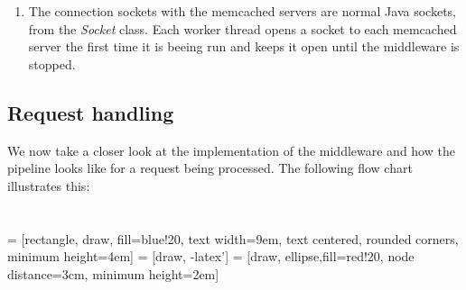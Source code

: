 \documentclass[11pt,a4paper]{article}
\begin{document}
\begin{enumerate}[ {(}1{)} ]
\item The connection sockets with the memcached servers are normal Java sockets, from the \textit{Socket} class. Each worker thread opens a socket to each memcached server the first time it is beeing run and keeps it open until the middleware is stopped.  
\end{enumerate}

\subsection{Request handling}
We now take a closer look at the implementation of the middleware and how the pipeline looks like for a request being processed. The following flow chart illustrates this:
\\
\\\\
 = [rectangle, draw, fill=blue!20, 
    text width=9em, text centered, rounded corners, minimum height=4em]
 = [draw, -latex']
 = [draw, ellipse,fill=red!20, node distance=3cm,
    minimum height=2em]   
\end{document}

